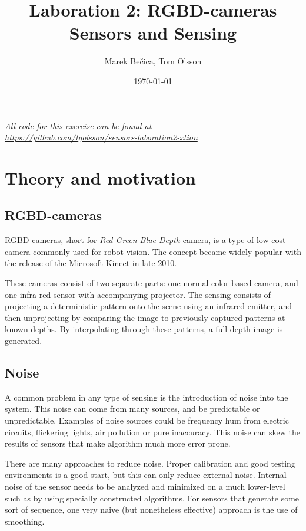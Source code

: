 \documentclass[11pt]{article}
\title{Laboration 2: RGBD-cameras\\ {\small Sensors and Sensing}}
\author{Marek Bečica, Tom Olsson}
\date{\today}
\begin{document}
\maketitle %
\begin{center}
  \emph{All code for this exercise can be found at \\ \url{https://github.com/tgolsson/sensors-laboration2-xtion}}
\end{center}
\tableofcontents
\lstlistoflistings %
\listoffigures %
\listoftables
\lstset{ matchrangestart=t} %
\section{Theory and motivation}


\subsection{RGBD-cameras}
RGBD-cameras, short for \emph{Red-Green-Blue-Depth}-camera, is a type of low-cost camera commonly used for robot vision. The concept became widely popular with the release of the Microsoft Kinect in late 2010. \par

These cameras consist of two separate parts: one normal color-based camera, and one infra-red sensor with accompanying projector. The sensing consists of projecting a deterministic pattern onto the scene using an infrared emitter, and then unprojecting by comparing the image to previously captured patterns at known depths. By interpolating through these patterns, a full depth-image is generated.  


\subsection{Noise}

A common problem in any type of sensing is the introduction of noise into the system. This noise can come from many sources, and be predictable or unpredictable. Examples of noise sources could be frequency hum from electric circuits, flickering lights, air pollution or pure inaccuracy. This noise can skew the results of sensors that make algorithm much more error prone. \par

There are many approaches to reduce noise. Proper calibration and good testing environments is a good start, but this can only reduce external noise. Internal noise of the sensor needs to be analyzed and minimized on a much lower-level such as by using specially constructed algorithms. For sensors that generate some sort of sequence, one very naive (but nonetheless effective) approach is the use of smoothing. \par
\end{document}

